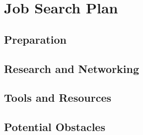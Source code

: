 \section{Job Search Plan}

\subsection{Preparation}

\subsection{Research and Networking}

\subsection{Tools and Resources}

\subsection{Potential Obstacles}
